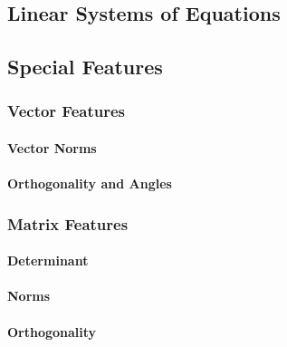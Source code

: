 \subsection{Linear Systems of Equations}




\subsection{Special Features}

\subsubsection{Vector Features}

\paragraph{Vector Norms}

\paragraph{Orthogonality and Angles}
% 

\subsubsection{Matrix Features}

\paragraph{Determinant}

\paragraph{Norms}

\paragraph{Orthogonality}

